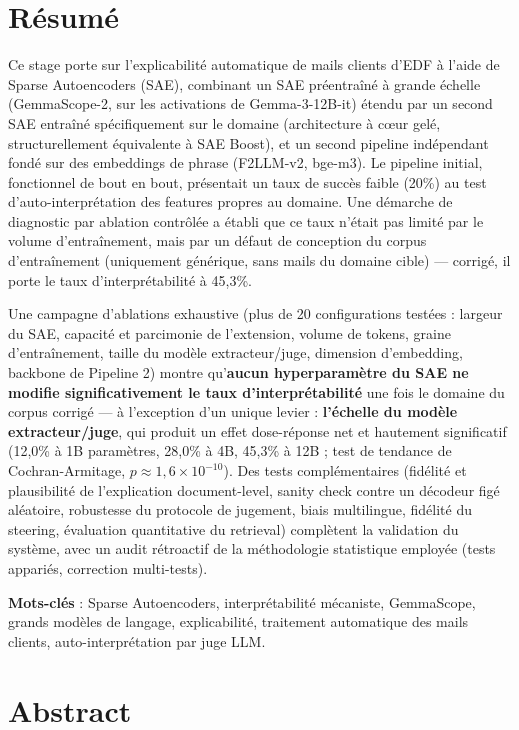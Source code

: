 \documentclass[11pt]{article}
\begin{document}
\newpage
\section*{Résumé}

Ce stage porte sur l'explicabilité automatique de mails clients d'EDF à
l'aide de Sparse Autoencoders (SAE), combinant un SAE préentraîné à grande
échelle (GemmaScope-2, sur les activations de Gemma-3-12B-it) étendu par un
second SAE entraîné spécifiquement sur le domaine (architecture à cœur gelé,
structurellement équivalente à SAE Boost), et un second pipeline indépendant
fondé sur des embeddings de phrase (F2LLM-v2, bge-m3). Le pipeline initial,
fonctionnel de bout en bout, présentait un taux de succès faible (20\%) au
test d'auto-interprétation des features propres au domaine. Une démarche de
diagnostic par ablation contrôlée a établi que ce taux n'était pas limité par
le volume d'entraînement, mais par un défaut de conception du corpus
d'entraînement (uniquement générique, sans mails du domaine cible) ---
corrigé, il porte le taux d'interprétabilité à 45,3\%.

Une campagne d'ablations exhaustive (plus de 20 configurations testées : largeur
du SAE, capacité et parcimonie de l'extension, volume de tokens, graine
d'entraînement, taille du modèle extracteur/juge, dimension d'embedding,
backbone de Pipeline 2) montre qu'\textbf{aucun hyperparamètre du SAE ne modifie
significativement le taux d'interprétabilité} une fois le domaine du corpus
corrigé --- à l'exception d'un unique levier : \textbf{l'échelle du modèle
extracteur/juge}, qui produit un effet dose-réponse net et hautement
significatif (12,0\% à 1B paramètres, 28,0\% à 4B, 45,3\% à 12B ; test de
tendance de Cochran-Armitage, $p \approx 1{,}6\times10^{-10}$). Des tests
complémentaires (fidélité et plausibilité de l'explication document-level,
sanity check contre un décodeur figé aléatoire, robustesse du protocole de
jugement, biais multilingue, fidélité du steering, évaluation quantitative du
retrieval) complètent la validation du système, avec un audit rétroactif de
la méthodologie statistique employée (tests appariés, correction multi-tests).

\textbf{Mots-clés} : Sparse Autoencoders, interprétabilité mécaniste,
GemmaScope, grands modèles de langage, explicabilité, traitement automatique
des mails clients, auto-interprétation par juge LLM.

\section*{Abstract}
\end{document}

